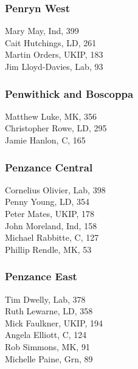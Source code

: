 \documentclass[a4paper,openany,10pt]{book}
\begin{document}
\subsubsection*{Penryn West}



Mary May, Ind, 399\\
Cait Hutchings, LD, 261\\
Martin Orders, UKIP, 183\\
Jim Lloyd-Davies, Lab, 93\\


\subsubsection*{Penwithick and Boscoppa}



Matthew Luke, MK, 356\\
Christopher Rowe, LD, 295\\
Jamie Hanlon, C, 165\\


\subsubsection*{Penzance Central}



Cornelius Olivier, Lab, 398\\
Penny Young, LD, 354\\
Peter Mates, UKIP, 178\\
John Moreland, Ind, 158\\
Michael Rabbitte, C, 127\\
Phillip Rendle, MK, 53\\


\subsubsection*{Penzance East}



Tim Dwelly, Lab, 378\\
Ruth Lewarne, LD, 358\\
Mick Faulkner, UKIP, 194\\
Angela Elliott, C, 124\\
Rob Simmons, MK, 91\\
Michelle Paine, Grn, 89\\
\end{document}
